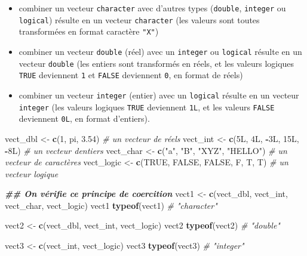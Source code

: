 \documentclass[
]{book}
\newenvironment{Shaded}{\begin{snugshade}}{\end{snugshade}}
\newcommand{\CommentTok}[1]{\textcolor[rgb]{0.56,0.35,0.01}{\textit{#1}}}
\newcommand{\ConstantTok}[1]{\textcolor[rgb]{0.56,0.35,0.01}{#1}}
\newcommand{\DataTypeTok}[1]{\textcolor[rgb]{0.13,0.29,0.53}{#1}}
\newcommand{\DecValTok}[1]{\textcolor[rgb]{0.00,0.00,0.81}{#1}}
\newcommand{\DocumentationTok}[1]{\textcolor[rgb]{0.56,0.35,0.01}{\textbf{\textit{#1}}}}
\newcommand{\FloatTok}[1]{\textcolor[rgb]{0.00,0.00,0.81}{#1}}
\newcommand{\FunctionTok}[1]{\textcolor[rgb]{0.13,0.29,0.53}{\textbf{#1}}}
\newcommand{\NormalTok}[1]{#1}
\newcommand{\OtherTok}[1]{\textcolor[rgb]{0.56,0.35,0.01}{#1}}
\newcommand{\SpecialCharTok}[1]{\textcolor[rgb]{0.81,0.36,0.00}{\textbf{#1}}}
\newcommand{\StringTok}[1]{\textcolor[rgb]{0.31,0.60,0.02}{#1}}
\providecommand{\tightlist}{%
  \setlength{\itemsep}{0pt}\setlength{\parskip}{0pt}}
\begin{document}
\begin{itemize}
\tightlist
\item
  combiner un vecteur \texttt{character} avec d'autres types (\texttt{double}, \texttt{integer} ou \texttt{logical}) résulte en un vecteur \texttt{character} (les valeurs sont toutes transformées en format caractère \texttt{"X"})
\item
  combiner un vecteur \texttt{double} (réel) avec un \texttt{integer} ou \texttt{logical} résulte en un vecteur \texttt{double} (les entiers sont transformés en réels, et les valeurs logiques \texttt{TRUE} deviennent \texttt{1} et \texttt{FALSE} deviennent \texttt{0}, en format de réels)
\item
  combiner un vecteur \texttt{integer} (entier) avec un \texttt{logical} résulte en un vecteur \texttt{integer} (les valeurs logiques \texttt{TRUE} deviennent \texttt{1L}, et les valeurs \texttt{FALSE} deviennent \texttt{0L}, en format d'entiers).
\end{itemize}

\begin{Shaded}
\begin{Highlighting}[]
\NormalTok{vect\_dbl }\OtherTok{\textless{}{-}} \FunctionTok{c}\NormalTok{(}\DecValTok{1}\NormalTok{, pi, }\FloatTok{3.54}\NormalTok{) }\CommentTok{\# un vecteur de réels}
\NormalTok{vect\_int }\OtherTok{\textless{}{-}} \FunctionTok{c}\NormalTok{(}\DecValTok{5}\DataTypeTok{L}\NormalTok{, }\DecValTok{4}\DataTypeTok{L}\NormalTok{, }\SpecialCharTok{{-}}\DecValTok{3}\DataTypeTok{L}\NormalTok{, }\DecValTok{15}\DataTypeTok{L}\NormalTok{, }\SpecialCharTok{{-}}\DecValTok{8}\DataTypeTok{L}\NormalTok{) }\CommentTok{\# un vecteur d\textquotesingle{}entiers}
\NormalTok{vect\_char }\OtherTok{\textless{}{-}} \FunctionTok{c}\NormalTok{(}\StringTok{"a"}\NormalTok{, }\StringTok{"B"}\NormalTok{, }\StringTok{"XYZ"}\NormalTok{, }\StringTok{"HELLO"}\NormalTok{) }\CommentTok{\# un vecteur de caractères}
\NormalTok{vect\_logic }\OtherTok{\textless{}{-}} \FunctionTok{c}\NormalTok{(}\ConstantTok{TRUE}\NormalTok{, }\ConstantTok{FALSE}\NormalTok{, }\ConstantTok{FALSE}\NormalTok{, F, T, T) }\CommentTok{\# un vecteur logique}

\DocumentationTok{\#\# On vérifie ce principe de coercition}
\NormalTok{vect1 }\OtherTok{\textless{}{-}} \FunctionTok{c}\NormalTok{(vect\_dbl, vect\_int, vect\_char, vect\_logic)}
\NormalTok{vect1}
\FunctionTok{typeof}\NormalTok{(vect1) }\CommentTok{\# "character"}

\NormalTok{vect2 }\OtherTok{\textless{}{-}} \FunctionTok{c}\NormalTok{(vect\_dbl, vect\_int, vect\_logic)}
\NormalTok{vect2}
\FunctionTok{typeof}\NormalTok{(vect2) }\CommentTok{\# "double"}

\NormalTok{vect3 }\OtherTok{\textless{}{-}} \FunctionTok{c}\NormalTok{(vect\_int, vect\_logic)}
\NormalTok{vect3}
\FunctionTok{typeof}\NormalTok{(vect3) }\CommentTok{\# "integer"}
\end{Highlighting}
\end{Shaded}
\end{document}
